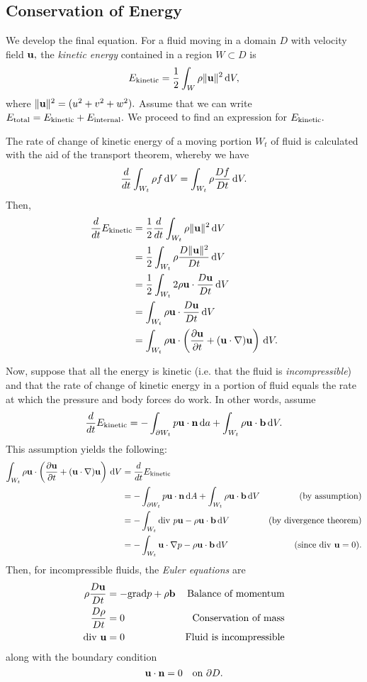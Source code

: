 \documentclass[10pt,a4paper,final]{article}
\begin{document}
\subsection{Conservation of Energy}
We develop the final equation. For a fluid moving in a domain $D$ with velocity field ${\bf u},$ the \emph{kinetic energy} contained in a region $W \subset D$ is 
\[ 
E_{\rm kinetic} = \frac{1}{2} \int_W \rho \| {\bf u}\|^2 \,\mathrm{d} V,
\]
where $\| {\bf u}\|^2 = (u^2 + v^2 + w^2).$ Assume that we can write $E_{\rm total} = E_{\rm kinetic} + E_{\rm internal}.$ We proceed to find an expression for $E_{\rm kinetic}.$

The rate of change of kinetic energy of a moving portion $W_t$ of fluid is calculated with the aid of the transport theorem, whereby we have 
\[ 
\frac{d}{dt}\int_{W_t} \rho f \,\mathrm{d} V = \int_{W_t} \rho \frac{Df}{Dt} \,\mathrm{d} V.
\]
Then, 
\begin{align}
\frac{d}{dt} E_{\rm kinetic}  &=  \frac{1}{2} \frac{d}{dt} \int_{W_t} \rho \| {\bf u}\|^2 \,\mathrm{d} V \\
&= \frac{1}{2}  \int_{W_t} \rho \frac{D \| {\bf u}\|^2}{Dt} \,\mathrm{d} V \\
&= \frac{1}{2} \int_{W_t} 2 \rho  {\bf u} \cdot \frac{D {\bf u}}{Dt} \,\mathrm{d} V \\
&= \int_{W_t} \rho  {\bf u} \cdot \frac{D {\bf u}}{Dt} \,\mathrm{d} V \\
&= \int_{W_t} \rho  {\bf u} \cdot \left( \frac{\partial {\bf u}}{\partial t} + ({\bf u} \cdot \nabla) {\bf u} \right) \,\mathrm{d} V.
\end{align}

Now, suppose that all the energy is kinetic (i.e. that the fluid is \emph{incompressible}) and that the rate of change of kinetic energy in a portion of fluid equals the rate at which the pressure and body forces do work. In other words, assume
\[ 
\frac{d}{dt} E_{\rm kinetic} = - \int_{\partial W_t} p {\bf u} \cdot {\bf n} \,\mathrm{d} a + \int_{W_t} \rho {\bf u} \cdot {\bf b} \,\mathrm{d} V.
\]
This assumption yields the following:
\begin{align*}
\int_{W_t} \rho  {\bf u} \cdot \left( \frac{\partial {\bf u}}{\partial t} + ({\bf u} \cdot \nabla) {\bf u} \right) \,\mathrm{d} V &= \frac{d}{dt} E_{\rm kinetic} \\
&= - \int_{\partial W_t} p {\bf u} \cdot {\bf n} \,\mathrm{d} A + \int_{W_t} \rho {\bf u} \cdot {\bf b} \,\mathrm{d} V &\text{(by assumption)}\\
&= - \int_{W_t} {\rm div}\ p {\bf u} - \rho {\bf u} \cdot {\bf b} \,\mathrm{d} V &\text{(by divergence theorem)} \\
&= - \int_{W_t} {\bf u} \cdot \nabla p - \rho {\bf u} \cdot {\bf b} \,\mathrm{d} V &\text{(since ${\rm div}\ {\bf u} = 0$)}.
\end{align*}
Then, for incompressible fluids, the \emph{Euler equations} are 
\begin{align*}
\rho\frac{D{\bf u}}{Dt} &= - {\rm grad} p + \rho{\bf b} &\text{Balance of momentum}\\ 
\frac{D \rho}{D t} &= 0 &\text{Conservation of mass} \\
{\rm div}\ {\bf u} &= 0 &\text{Fluid is incompressible}
\end{align*}
along with the boundary condition 
\[ {\bf u} \cdot {\bf n} = 0 \quad \mbox{on } \partial D.\]
\end{document}
